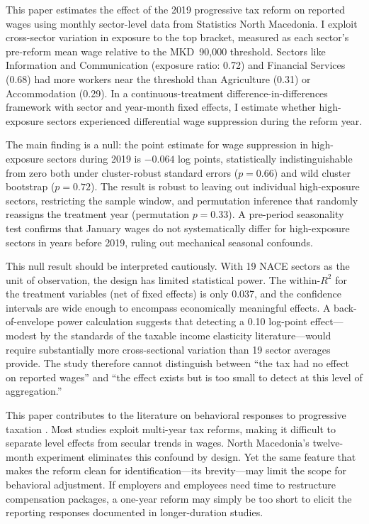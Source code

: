 \documentclass[12pt]{article}
\begin{document}
This paper estimates the effect of the 2019 progressive tax reform on reported wages using monthly sector-level data from Statistics North Macedonia. I exploit cross-sector variation in exposure to the top bracket, measured as each sector's pre-reform mean wage relative to the MKD~90,000 threshold. Sectors like Information and Communication (exposure ratio: 0.72) and Financial Services (0.68) had more workers near the threshold than Agriculture (0.31) or Accommodation (0.29). In a continuous-treatment difference-in-differences framework with sector and year-month fixed effects, I estimate whether high-exposure sectors experienced differential wage suppression during the reform year.

The main finding is a null: the point estimate for wage suppression in high-exposure sectors during 2019 is $-0.064$ log points, statistically indistinguishable from zero both under cluster-robust standard errors ($p = 0.66$) and wild cluster bootstrap ($p = 0.72$). The result is robust to leaving out individual high-exposure sectors, restricting the sample window, and permutation inference that randomly reassigns the treatment year (permutation $p = 0.33$). A pre-period seasonality test confirms that January wages do not systematically differ for high-exposure sectors in years before 2019, ruling out mechanical seasonal confounds.

This null result should be interpreted cautiously. With 19 NACE sectors as the unit of observation, the design has limited statistical power. The within-$R^2$ for the treatment variables (net of fixed effects) is only 0.037, and the confidence intervals are wide enough to encompass economically meaningful effects. A back-of-envelope power calculation suggests that detecting a 0.10 log-point effect---modest by the standards of the taxable income elasticity literature---would require substantially more cross-sectional variation than 19 sector averages provide. The study therefore cannot distinguish between ``the tax had no effect on reported wages'' and ``the effect exists but is too small to detect at this level of aggregation.''

This paper contributes to the literature on behavioral responses to progressive taxation \citep{saez2012elasticity, kleven2014estimating, chetty2011adjustment}. Most studies exploit multi-year tax reforms, making it difficult to separate level effects from secular trends in wages. North Macedonia's twelve-month experiment eliminates this confound by design. Yet the same feature that makes the reform clean for identification---its brevity---may limit the scope for behavioral adjustment. If employers and employees need time to restructure compensation packages, a one-year reform may simply be too short to elicit the reporting responses documented in longer-duration studies.
\end{document}
